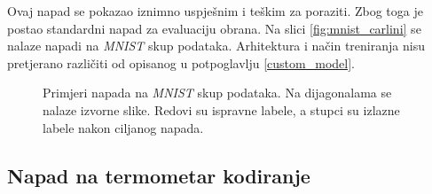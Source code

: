 \documentclass[utf8, diplomski]{fer}
\begin{document}
Ovaj napad se pokazao iznimno uspješnim i teškim za poraziti. Zbog toga je postao standardni napad za evaluaciju obrana. Na slici \ref{fig:mnist_carlini} se nalaze napadi na \textit{MNIST} skup podataka. Arhitektura i način treniranja nisu pretjerano različiti od opisanog u potpoglavlju \ref{custom_model}.

\begin{figure}[H]
  \centering
  \hfill
  \caption{Primjeri napada na \textit{MNIST} skup podataka. Na dijagonalama se nalaze izvorne slike. Redovi su ispravne labele, a stupci su izlazne labele nakon ciljanog napada.}
\end{figure}\label{fig:mnist_carlini}

\subsection{Napad na termometar kodiranje}
\end{document}
